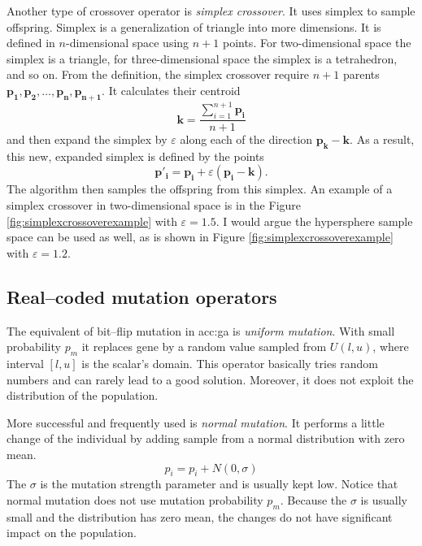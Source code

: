 Another type of crossover operator is \emph{simplex crossover}. It uses simplex to sample offspring. Simplex is a generalization of triangle into more dimensions. It is defined in $n$-dimensional space using $n+1$ points. For two-dimensional space the simplex is a triangle, for three-dimensional space the simplex is a tetrahedron, and so on. From the definition, the simplex crossover require $n+1$ parents $\mathbf{p_1}, \mathbf{p_2}, \dots, \mathbf{p_n}, \mathbf{p_{n+1}}$. It calculates their centroid
$$
\mathbf{k}=\frac{\sum_{i=1}^{n+1} \mathbf{p_i}}{n+1}
$$
and then expand the simplex by $\varepsilon$ along each of the direction $\mathbf{p_k} - \mathbf{k}$. As a result, this new, expanded simplex is defined by the points
$$
\mathbf{p'_i} = \mathbf{p_i} + \varepsilon\left( \mathbf{p_i} - \mathbf{k} \right).
$$
The algorithm then samples the offspring from this simplex. An example of a simplex crossover in two-dimensional space is in the Figure \ref{fig:simplexcrossoverexample} with $\varepsilon=1.5$.
I would argue the hypersphere sample space can be used as well, as is shown in Figure \ref{fig:simplexcrossoverexample} with $\varepsilon=1.2$.

\subsection{Real--coded mutation operators}

The equivalent of bit--flip mutation in \acrshort{acc:ga} is \emph{uniform mutation}. With small probability $p_m$ it replaces gene by a random value sampled from $U(l,u)$, where interval $\left[l,u\right]$ is the scalar's domain. This operator basically tries random numbers and can rarely lead to a good solution. Moreover, it does not exploit the distribution of the population.

More successful and frequently used is \emph{normal mutation}. It performs a little change of the individual by adding sample from a normal distribution with zero mean.
$$
p_i = p_i + N(0,\sigma)
$$
The $\sigma$ is the mutation strength parameter and is usually kept low. Notice that normal mutation does not use mutation probability $p_m$. Because the $\sigma$ is usually small and the distribution has zero mean, the changes do not have significant impact on the population.

